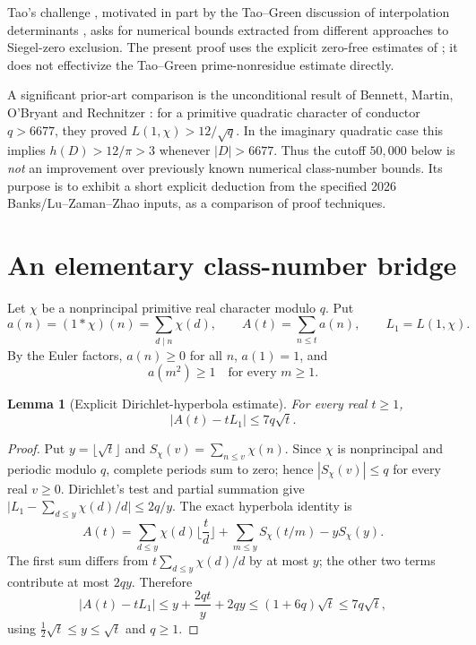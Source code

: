 \documentclass[10pt,a4paper]{article}
\newtheorem{lemma}{Lemma}
\begin{document}
Tao's challenge \cite{tao2}, motivated in part by the
Tao--Green discussion of interpolation determinants \cite{tao1},
asks for numerical bounds extracted from different approaches to
Siegel-zero exclusion.  The present proof uses the explicit zero-free
estimates of \cite{banks,lzz}; it does not effectivize the
Tao--Green prime-nonresidue estimate directly.

A significant prior-art comparison is the unconditional result of
Bennett, Martin, O'Bryant and Rechnitzer
\cite[Proposition~1.10]{bennett}: for a primitive quadratic character
of conductor $q>6677$, they proved $L(1,\chi)>12/\sqrt q$.
In the imaginary quadratic case this implies
$h(D)>12/\pi>3$ whenever $|D|>6677$.
Thus the cutoff $50{,}000$ below is \emph{not} an improvement over
previously known numerical class-number bounds.  Its purpose is to
exhibit a short explicit deduction from the specified 2026
Banks/Lu--Zaman--Zhao inputs, as a comparison of proof techniques.

\section{An elementary class-number bridge}
Let $\chi$ be a nonprincipal primitive real character modulo $q$. Put
\[
 a(n)=(1*\chi)(n)=\sum_{d\mid n}\chi(d),\qquad
 A(t)=\sum_{n\le t}a(n),\qquad L_1=L(1,\chi).
\]
By the Euler factors, $a(n)\ge0$ for all $n$, $a(1)=1$, and
\begin{equation}\label{eq:squares}
 a(m^2)\ge1\quad\text{for every }m\ge1.
\end{equation}

\begin{lemma}[Explicit Dirichlet-hyperbola estimate]\label{lem:hyperbola}
For every real $t\ge1$,
\[
 \boxed{\ |A(t)-tL_1|\le7q\sqrt t.\ }
\]
\end{lemma}
\begin{proof}
Put $y=\lfloor\sqrt t\rfloor$ and
$S_\chi(v)=\sum_{n\le v}\chi(n)$. Since $\chi$ is nonprincipal and
periodic modulo $q$, complete periods sum to zero; hence
$|S_\chi(v)|\le q$ for every real $v\ge0$. Dirichlet's test and
partial summation give
$\big|L_1-\sum_{d\le y}\chi(d)/d\big|\le2q/y$.
The exact hyperbola identity is
\[
 A(t)=\sum_{d\le y}\chi(d)\Big\lfloor\frac td\Big\rfloor
  +\sum_{m\le y}S_\chi(t/m)-yS_\chi(y).
\]
The first sum differs from $t\sum_{d\le y}\chi(d)/d$ by at most $y$;
the other two terms contribute at most $2qy$. Therefore
\[
 |A(t)-tL_1|\le y+\frac{2qt}{y}+2qy
 \le(1+6q)\sqrt t\le7q\sqrt t,
\]
using $\frac12\sqrt t\le y\le\sqrt t$ and $q\ge1$.
\end{proof}
\end{document}
